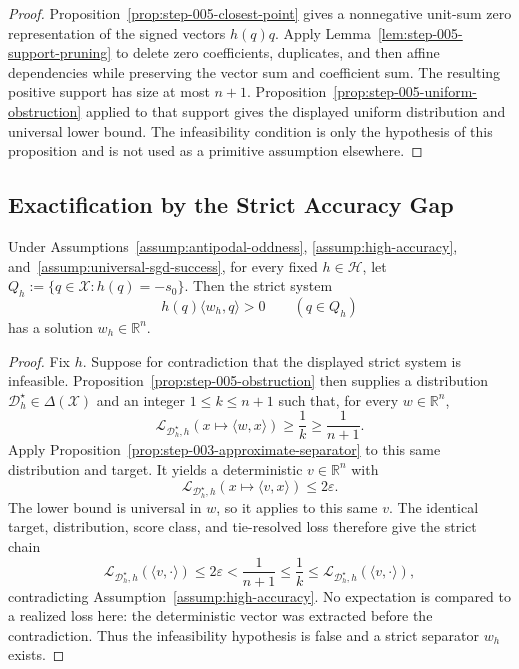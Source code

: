 \begin{proof}
Proposition~\ref{prop:step-005-closest-point} gives a nonnegative unit-sum
zero representation of the signed vectors $h(q)q$.  Apply
Lemma~\ref{lem:step-005-support-pruning} to delete zero coefficients,
duplicates, and then affine dependencies while preserving the vector sum and
coefficient sum.  The resulting positive support has size at most $n+1$.
Proposition~\ref{prop:step-005-uniform-obstruction} applied to that support
gives the displayed uniform distribution and universal lower bound.  The
infeasibility condition is only the hypothesis of this proposition and is not
used as a primitive assumption elsewhere.
\end{proof}

\subsection{Exactification by the Strict Accuracy Gap}
\label{app:exactification}

\begin{proposition}
\label{prop:step-006-feasibility}
Under Assumptions~\ref{assump:antipodal-oddness},
\ref{assump:high-accuracy}, and~\ref{assump:universal-sgd-success}, for every
fixed $h\in\mathcal H$, let $Q_h:=\{q\in\mathcal X:h(q)=-s_0\}$.  Then the
strict system
\[
 h(q)\langle w_h,q\rangle>0\qquad(q\in Q_h)
\]
has a solution $w_h\in\mathbb R^n$.
\end{proposition}

\begin{proof}
Fix $h$.  Suppose for contradiction that the displayed strict system is
infeasible.  Proposition~\ref{prop:step-005-obstruction} then supplies a
distribution $\mathcal D_h^\star\in\Delta(\mathcal X)$ and an integer
$1\leq k\leq n+1$ such that, for every $w\in\mathbb R^n$,
\[
 \mathcal L_{\mathcal D_h^\star,h}(x\mapsto\langle w,x\rangle)
 \geq\frac1k\geq\frac1{n+1}.
\]
Apply Proposition~\ref{prop:step-003-approximate-separator} to this same
distribution and target.  It yields a deterministic $v\in\mathbb R^n$ with
\[
 \mathcal L_{\mathcal D_h^\star,h}(x\mapsto\langle v,x\rangle)
 \leq2\varepsilon.
\]
The lower bound is universal in $w$, so it applies to this same $v$.  The
identical target, distribution, score class, and tie-resolved loss therefore
give the strict chain
\[
 \mathcal L_{\mathcal D_h^\star,h}(\langle v,\cdot\rangle)
 \leq2\varepsilon
 <\frac1{n+1}
 \leq\frac1k
 \leq\mathcal L_{\mathcal D_h^\star,h}(\langle v,\cdot\rangle),
\]
contradicting Assumption~\ref{assump:high-accuracy}.  No expectation is
compared to a realized loss here: the deterministic vector was extracted
before the contradiction.  Thus the infeasibility hypothesis is false and a
strict separator $w_h$ exists.
\end{proof}

